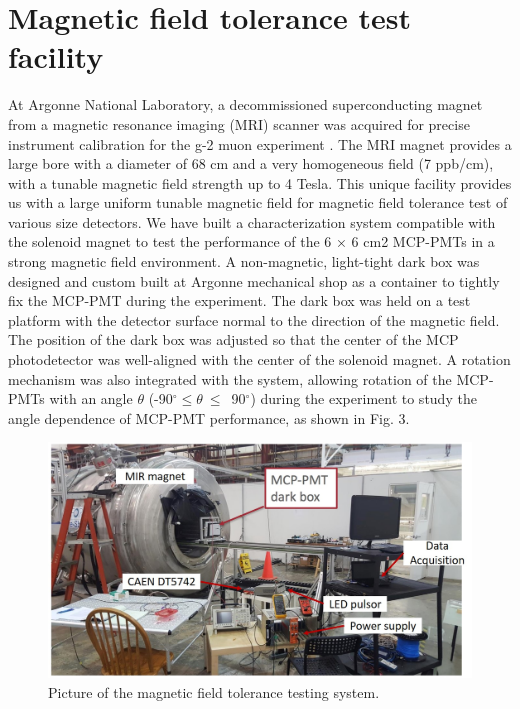 \documentclass[preprint,5p]{elsarticle}
\begin{document}
\section{Magnetic field tolerance test facility} \label{sc}
At Argonne National Laboratory, a decommissioned superconducting magnet from a 
magnetic resonance imaging (MRI) scanner was acquired for precise instrument 
calibration for the g-2 muon experiment \cite{18}. The MRI magnet provides a 
large bore with a diameter of 68 cm and a very homogeneous field (7 ppb/cm), 
with a tunable magnetic field strength up to 4 Tesla. This unique facility 
provides us with a large uniform tunable magnetic field for magnetic field 
tolerance test of various size detectors. We have built a characterization 
system compatible with the solenoid magnet to test the performance of the 6 × 6 
cm2 MCP-PMTs in a strong magnetic field environment. A non-magnetic, 
light-tight dark box was designed and custom built at Argonne mechanical shop 
as a container to tightly fix the MCP-PMT during the experiment. The dark box 
was held on a test platform with the detector surface normal to the direction 
of the magnetic field. The position of the dark box was adjusted so that the 
center of the MCP photodetector was well-aligned with the center of the 
solenoid magnet. A rotation mechanism was also integrated with the system, 
allowing rotation of the MCP-PMTs with an angle $\theta$ (-90$^{\circ} ≤ 
\theta~≤$~90$^{\circ}$) during the experiment to study the angle dependence of 
MCP-PMT performance, as shown in Fig. 3.

\begin{figure}[tbp]
\centering \includegraphics[scale=0.4]{fig/OYqCuD.jpg}
\caption{Picture of the magnetic field tolerance testing system.} 
   \label{fig:design}
\end{figure}
\end{document}
